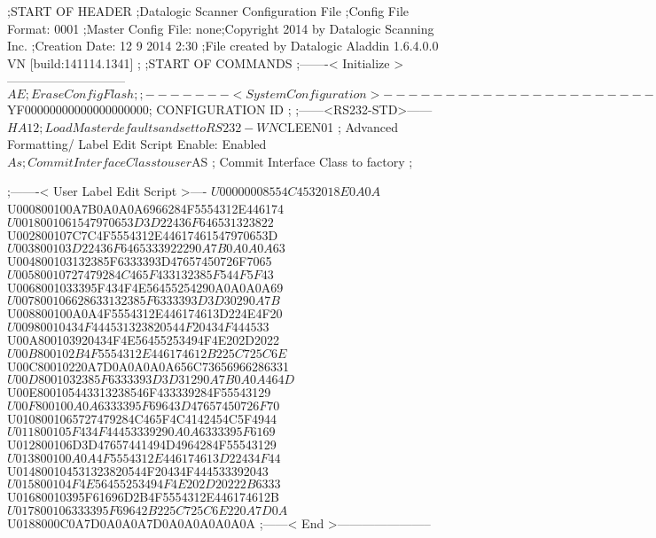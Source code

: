 ;START OF HEADER
;Datalogic Scanner Configuration File
;Config File Format: 0001
;Master Config File: none;Copyright 2014 by Datalogic Scanning Inc.
;Creation Date: 12 9 2014 2:30
;File created by Datalogic Aladdin 1.6.4.0.0 VN [build:141114.1341]
;
;START OF COMMANDS
;-------< Initialize >-----------------------------
$AE                 ; Erase Config Flash
;
;-------< System Configuration >-------------------------------
$YF00000000000000000000; CONFIGURATION ID
;
;------<RS232-STD>------
$HA12               ; Load Master defaults and set to RS232-WN
$CLEEN01            ; Advanced Formatting/ Label Edit Script Enable: Enabled
$As                 ; Commit Interface Class to user
$AS                 ; Commit Interface Class to factory
;

;-------< User Label Edit Script >----
$U00000008554C4532018E0A0A
$U000800100A7B0A0A0A6966284F5554312E446174
$U0018001061547970653D3D22436F646531323822
$U002800107C7C4F5554312E44617461547970653D
$U003800103D22436F6465333922290A7B0A0A0A63
$U004800103132385F6333393D47657450726F7065
$U00580010727479284C465F433132385F544F5F43
$U0068001033395F434F4E56455254290A0A0A0A69
$U007800106628633132385F6333393D3D30290A7B
$U008800100A0A4F5554312E446174613D224E4F20
$U00980010434F444531323820544F20434F444533
$U00A800103920434F4E56455253494F4E202D2022
$U00B800102B4F5554312E446174612B225C725C6E
$U00C80010220A7D0A0A0A0A656C73656966286331
$U00D8001032385F6333393D3D31290A7B0A0A464D
$U00E800105443313238546F433339284F55543129
$U00F800100A0A6333395F69643D47657450726F70
$U0108001065727479284C465F4C4142454C5F4944
$U011800105F434F44453339290A0A6333395F6169
$U012800106D3D47657441494D4964284F55543129
$U013800100A0A4F5554312E446174613D22434F44
$U014800104531323820544F20434F444533392043
$U015800104F4E56455253494F4E202D20222B6333
$U01680010395F61696D2B4F5554312E446174612B
$U017800106333395F69642B225C725C6E220A7D0A
$U0188000C0A7D0A0A0A7D0A0A0A0A0A0A
;------< End >-----------------------
